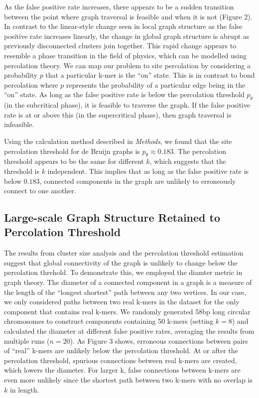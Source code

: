\documentclass[12pt]{article} \usepackage{simplemargins}
\begin{document}
As the false positive rate increases, there appears to be a sudden
transition between the point where graph traversal is feasible and
when it is not (Figure 2). In contrast to the linear-style change seen 
in local graph structure as the false positive rate increases linearly, 
the change in global graph structure is abrupt as previously disconnected 
clusters join together.  
This rapid change appears to resemble a phase transition in the
field of physics, which can be modelled using percolation theory. We can map 
our problem to site percolation by considering a probability $p$ that a 
particular k-mer is the ``on'' state. This is in contrast to bond percolation where 
$p$ represents the probability of a particular edge being in the ``on'' state. As
long as the false positive rate is below the percolation threshold $p_\theta$ (in
the subcritical phase), it is feasible to traverse the graph. If the
false positive rate is at or above this (in the supercritical phase), then graph
traversal is infeasible.

Using the calculation method described in \emph{Methods}, we found that the 
site percolation threshold for de Bruijn graphs is $p_\theta \approx 0.183$. 
The percolation threshold appears to be the same for 
different $k$, which suggests that the 
threshold is $k$ independent. This implies that as long as the 
false positive rate is below $0.183$, connected components in the graph 
are unlikely to erroneously connect to one another.

\subsection{Large-scale Graph Structure Retained to Percolation Threshold}
The results from cluster size analysis and the percolation threshold 
estimation suggest that 
global connectivity of the graph is unlikely 
to change below the percolation threhold. To demonstrate this, we employed 
the diamter metric in graph theory.  
The diameter of a connected component in a graph is a measure of 
the length of the ``longest shortest'' 
path between any two vertices\cite{bondy2008graph}.
In our case, we only considered paths between two real k-mers
in the dataset for the only component that contains real k-mers. 
We randomly generated 58bp long circular
chromosomes to construct components containing 50 k-mers (setting $k=8$) and 
calculated the diameter at different false positive rates, averaging
the results from multiple runs ($n=20$).
As Figure 3 shows, 
erroneous connections between pairs of ``real'' k-mers are unlikely
below the 
percolation threshold. At or after the percolation threshold, spurious connections 
between real k-mers are created, which lowers the diameter. For larger k, false connections 
between k-mers are even more unlikely since the shortest path between two k-mers 
with no overlap is $k$ in length.
\end{document}
